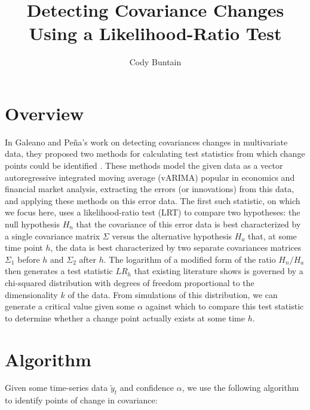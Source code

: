\documentclass[12pt]{article}
\title{Detecting Covariance Changes Using a Likelihood-Ratio Test}
\author{Cody Buntain}
\date{}
\begin{document}
\maketitle

\section{Overview}

In Galeano and Pe\~{n}a's work on detecting covariances changes in multivariate data, they proposed two methods for calculating test statistics from which change points could be identified \cite{galeano2007covariance}. 
These methods model the given data as a vector autoregressive integrated moving average (vARIMA) popular in economics and financial market analysis, extracting the errors (or innovations) from this data, and applying these methods on this error data.
The first such statistic, on which we focus here, uses a likelihood-ratio test (LRT) to compare two hypotheses: the null hypothesis $H_n$ that the covariance of this error data is best characterized by a single covariance matrix $\Sigma$ versus the alternative hypothesis $H_a$ that, at some time point $h$, the data is best characterized by two separate covariances matrices $\Sigma_1$ before $h$ and $\Sigma_2$ after $h$.
The logarithm of a modified form of the ratio $H_n/H_a$ then generates a test statistic $LR_{h}$ that existing literature shows is governed by a chi-squared distribution with degrees of freedom proportional to the dimensionality $k$ of the data.
From simulations of this distribution, we can generate a critical value given some $\alpha$ against which to compare this test statistic to determine whether a change point actually exists at some time $h$.

\section{Algorithm}

Given some time-series data $\tilde{y}_t$ and confidence $\alpha$, we use the following algorithm to identify points of change in covariance:
\end{document}
